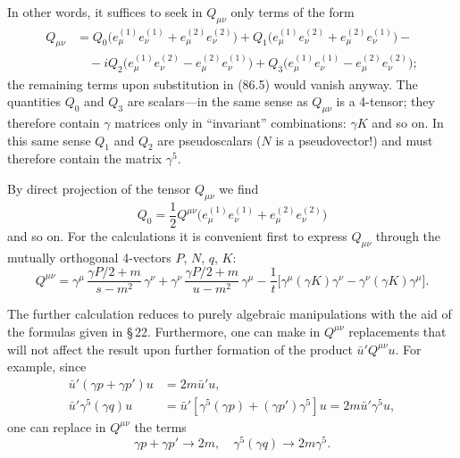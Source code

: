 
In other words, it suffices to seek in $Q_{\mu\nu}$ only terms of the form
\begin{equation}
\begin{split}
Q_{\mu\nu} &= Q_0\bigl(e^{(1)}_\mu e^{(1)}_\nu + e^{(2)}_\mu e^{(2)}_\nu\bigr) + Q_1\bigl(e^{(1)}_\mu e^{(2)}_\nu + e^{(2)}_\mu e^{(1)}_\nu\bigr) - {} \\
&\quad {} - iQ_2\bigl(e^{(1)}_\mu e^{(2)}_\nu - e^{(2)}_\mu e^{(1)}_\nu\bigr) + Q_3\bigl(e^{(1)}_\mu e^{(1)}_\nu - e^{(2)}_\mu e^{(2)}_\nu\bigr);
\end{split}
\label{eq:87.3}
\end{equation}
the remaining terms upon substitution in (86.5) would vanish anyway. The quantities $Q_0$ and $Q_3$ are scalars---in the same sense as $Q_{\mu\nu}$ is a 4-tensor; they therefore contain $\gamma$ matrices only in ``invariant'' combinations: $\gamma K$ and so on. In this same sense $Q_1$ and $Q_2$ are pseudoscalars ($N$ is a pseudovector!) and must therefore contain the matrix $\gamma^5$.

By direct projection of the tensor $Q_{\mu\nu}$ we find
\[
Q_0 = \frac{1}{2}Q^{\mu\nu}\bigl(e^{(1)}_\mu e^{(1)}_\nu + e^{(2)}_\mu e^{(2)}_\nu\bigr)
\]
and so on. For the calculations it is convenient first to express $Q_{\mu\nu}$ through the mutually orthogonal 4-vectors $P$, $N$, $q$, $K$:
\[
Q^{\mu\nu} = \gamma^\mu\,\frac{\gamma P/2 + m}{s - m^2}\,\gamma^\nu + \gamma^\nu\,\frac{\gamma P/2 + m}{u - m^2}\,\gamma^\mu - \frac{1}{t}\bigl[\gamma^\mu(\gamma K)\gamma^\nu - \gamma^\nu(\gamma K)\gamma^\mu\bigr].
\]

The further calculation reduces to purely algebraic manipulations with the aid of the formulas given in \S\,22. Furthermore, one can make in $Q^{\mu\nu}$ replacements that will not affect the result upon further formation of the product $\bar{u}'Q^{\mu\nu}u$. For example, since
\begin{align*}
\bar{u}'(\gamma p + \gamma p')u &= 2m\bar{u}'u, \\
\bar{u}'\gamma^5(\gamma q)u &= \bar{u}'[\gamma^5(\gamma p) + (\gamma p')\gamma^5]u = 2m\bar{u}'\gamma^5 u,
\end{align*}
one can replace in $Q^{\mu\nu}$ the terms
\begin{equation}
\gamma p + \gamma p' \to 2m, \quad \gamma^5(\gamma q) \to 2m\gamma^5.
\label{eq:87.4}
\end{equation}

